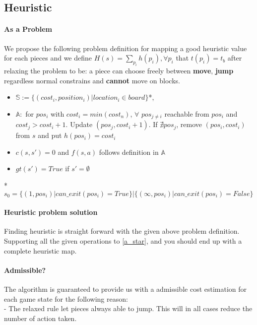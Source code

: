 \documentclass[11pt,a4paper]{article}
\begin{document}
    \subsection{Heuristic}
        \paragraph{As a Problem} We propose the following problem definition for mapping a good heuristic value for each pieces and we define $H(s) = \sum_{p_i}h(p_i), \forall p_i$ that $t(p_i) = t_b$ after relaxing the problem to be: a piece can choose freely between \textbf{move}, \textbf{jump} regardless normal constrains and \textbf{cannot} move on blocks.
        \begin{itemize}
            \itemsep0em   
            \item $\mathbb{S} := \{(cost_i, position_i)|location_i\in board\}$*,
            \item $\mathbb{A} :$ for $pos_i$ with $cost_i=min({cost_n})$, $\forall$ $pos_{j\ne i} $ reachable from $pos_i$ and $cost_j > cost_i+1$. Update $(pos_j, cost_i + 1)$. If $\nexists pos_j$, remove $(pos_i, cost_i)$ from $s$ and put $h(pos_i) = cost_i$
            \item $c(s, s')=0$ and $f(s,a)$ follows definition in $\mathbb{A}$
            \item $gt(s')=True$ if $s' = \emptyset$
        \end{itemize}
        *$s_0 = \{(1, pos_i)|can\_exit(pos_i) = True\} | \{(\infty, pos_i)|can\_exit(pos_i) = False\}$
        \vspace{-10pt}
        \paragraph{Heuristic problem solution} Finding heuristic is straight forward with the given above problem definition. Supporting all the given operations to \ref{a_star}, and you should end up with a complete heuristic map.
        \vspace{-10pt}
        \paragraph{Admissible?} The algorithm is guaranteed to provide us with a admissible cost estimation for each game state for the following reason:\\
    - The relaxed rule let pieces always able to jump. This will in all cases reduce the number of action taken.
    \vspace{-10pt}
\end{document}

